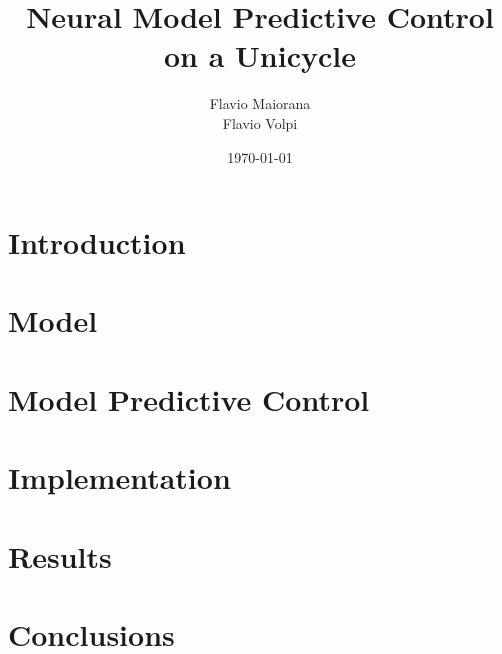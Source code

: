 \documentclass[a4paper, onecolumn, 12pt]{article}
\title{Neural Model Predictive Control on a Unicycle}
\author{Flavio Maiorana \\ Flavio Volpi}
\date{\today} %
\begin{document}

\newpage
\tableofcontents
\newpage

\clearpage
\section{Introduction} 
\section{Model} 
\section{Model Predictive Control} 
\section{Implementation} 
\section{Results} 
\section{Conclusions} 



\end{document}

